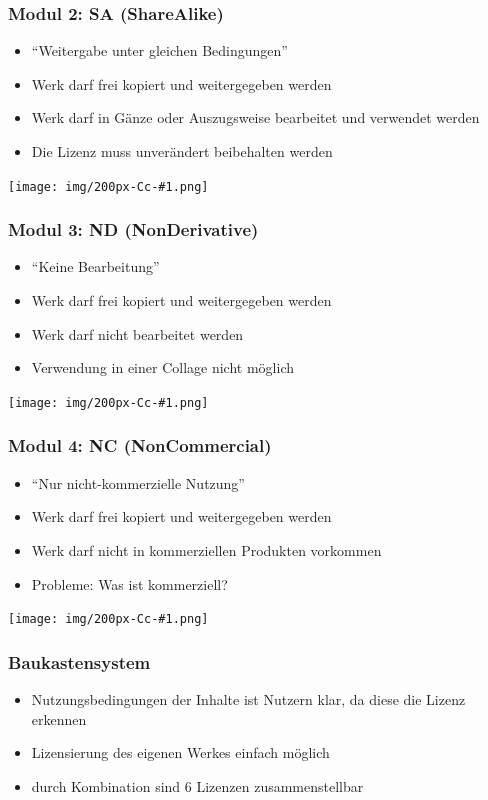 \documentclass[table]{beamer}
\newcommand{\Cc}[1]{\begin{center}
    \texttt{[image: img/200px-Cc-\#1.png]}
\end{center}}
\begin{document}
\begin{frame}
    \frametitle{Modul 2: SA (ShareAlike)}
    \begin{itemize}
        \item "`Weitergabe unter gleichen Bedingungen"'
        \item Werk darf frei kopiert und weitergegeben werden
        \item Werk darf in Gänze oder Auszugsweise bearbeitet und verwendet werden
        \item Die Lizenz muss unverändert beibehalten werden
    \end{itemize}
    \Cc{sa}
\end{frame}

\begin{frame}
    \frametitle{Modul 3: ND (NonDerivative)}
    \begin{itemize}
        \item "`Keine Bearbeitung"'
        \item Werk darf frei kopiert und weitergegeben werden
        \item Werk darf nicht bearbeitet werden
        \item Verwendung in einer Collage nicht möglich
    \end{itemize}
    \Cc{nd}
\end{frame}

\begin{frame}
    \frametitle{Modul 4: NC (NonCommercial)}
    \begin{itemize}
        \item "`Nur nicht-kommerzielle Nutzung"'
        \item Werk darf frei kopiert und weitergegeben werden
        \item Werk darf nicht in kommerziellen Produkten vorkommen
        \item Probleme: Was ist kommerziell?
    \end{itemize}
    \Cc{nc}
\end{frame}

\begin{frame}
    \frametitle{Baukastensystem}
    \begin{itemize}
        \item<1-> Nutzungsbedingungen der Inhalte ist Nutzern klar, da diese die Lizenz erkennen
        \item<2-> Lizensierung des eigenen Werkes einfach möglich
        \item<3-> durch Kombination sind 6 Lizenzen zusammenstellbar
    \end{itemize}
\end{frame}
\end{document}
